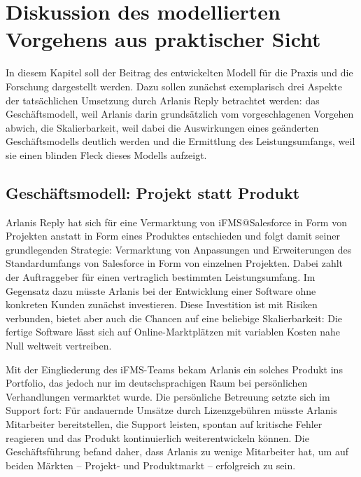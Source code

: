 \section{Diskussion des modellierten Vorgehens aus praktischer Sicht}
\label{cha:diskussion}
\begin{comment}
Im vorletzten Abschnitt diskutieren Sie Ihre Ergebnisse und stellen den Beitrag 
für die Praxis und für die Forschung dar. Gehen Sie auch auf die Einschränkungen 
Ihrer Arbeit ein.
\end{comment}
In diesem Kapitel soll der Beitrag des entwickelten Modell für die Praxis und 
die Forschung dargestellt werden. Dazu sollen zunächst exemplarisch drei 
Aspekte der tatsächlichen Umsetzung durch Arlanis Reply betrachtet werden: das 
Geschäftsmodell, weil Arlanis darin grundsätzlich vom vorgeschlagenen Vorgehen 
abwich, die Skalierbarkeit, weil dabei die Auswirkungen eines geänderten 
Geschäftsmodells deutlich werden und die Ermittlung des Leistungsumfangs, weil 
sie einen blinden Fleck dieses Modells aufzeigt.

\subsection{Geschäftsmodell: Projekt statt Produkt}
Arlanis Reply hat sich für eine Vermarktung von iFMS@Salesforce in Form von 
Projekten anstatt in Form eines Produktes entschieden und folgt damit seiner 
grundlegenden Strategie: Vermarktung von Anpassungen und Erweiterungen des 
Standardumfangs von Salesforce in Form von einzelnen Projekten. Dabei zahlt der 
Auftraggeber für einen vertraglich bestimmten Leistungsumfang. Im Gegensatz 
dazu müsste Arlanis bei der Entwicklung einer Software ohne konkreten Kunden 
zunächst investieren. Diese Investition ist mit Risiken verbunden, bietet aber 
auch die Chancen auf eine beliebige Skalierbarkeit: Die fertige Software lässt 
sich auf Online-Marktplätzen mit variablen Kosten nahe Null weltweit vertreiben.

Mit der Eingliederung des iFMS-Teams bekam Arlanis ein solches Produkt ins 
Portfolio, das jedoch nur im deutschsprachigen Raum bei persönlichen 
Verhandlungen vermarktet wurde. Die persönliche Betreuung setzte sich im 
Support fort: Für andauernde Umsätze durch Lizenzgebühren müsste Arlanis 
Mitarbeiter bereitstellen, die Support leisten, spontan auf kritische Fehler 
reagieren und das Produkt kontinuierlich weiterentwickeln können. Die 
Geschäftsführung befand daher, dass Arlanis zu wenige Mitarbeiter hat, um auf 
beiden Märkten -- Projekt- und Produktmarkt -- erfolgreich zu sein.

